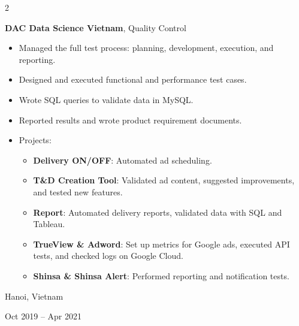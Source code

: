 \documentclass[10pt, letterpaper]{article}
\newenvironment{highlights}{
    \begin{itemize}[
        topsep=0.10 cm,
        parsep=0.10 cm,
        partopsep=0pt,
        itemsep=0pt,
        leftmargin=0.4 cm + 10pt
    ]
    }{
    \end{itemize}
} %
\newenvironment{twocolentry}[2][]{
    \onecolentry
    \def\secondColumn{#2}
    \setcolumnwidth{\fill, 4.5 cm}
    \begin{paracol}{2}
    }{
        \switchcolumn \raggedleft \secondColumn
    \end{paracol}
    \endonecolentry
} %
\begin{document}
    \vspace{0.2 cm}

    \begin{twocolentry}{
        Hanoi, Vietnam

        Oct 2019 -- Apr 2021
    }
        \textbf{DAC Data Science Vietnam}, Quality Control
        \begin{highlights}
            \item Managed the full test process: planning, development, execution, and reporting.
            \item Designed and executed functional and performance test cases.
            \item Wrote SQL queries to validate data in MySQL.
            \item Reported results and wrote product requirement documents.
            \item Projects:
            \begin{itemize}
                \item \textbf{Delivery ON/OFF}: Automated ad scheduling.
                \item \textbf{T\&D Creation Tool}: Validated ad content, suggested improvements, and tested new features.
                \item \textbf{Report}: Automated delivery reports, validated data with SQL and Tableau.
                \item \textbf{TrueView \& Adword}: Set up metrics for Google ads, executed API tests, and checked logs on Google Cloud.
                \item \textbf{Shinsa \& Shinsa Alert}: Performed reporting and notification tests.
            \end{itemize}
        \end{highlights}
    \end{twocolentry}

    \vspace{0.2 cm}






\end{document}
